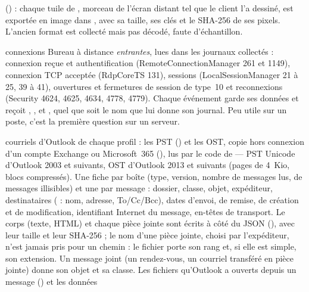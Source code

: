 \documentclass[11pt,a4paper,oneside]{report}
\begin{document}
\begin{description}[style=nextline,leftmargin=1.2em]
        () : chaque tuile de , morceau de
        l'écran distant tel que le client l'a dessiné, est exportée en image
        dans , avec
        sa taille, ses clés et le SHA-256 de ses pixels. L'ancien format
         est collecté mais pas décodé, faute
        d'échantillon.
  \item[\fichier{rdp\_server.json}] connexions Bureau à distance \emph{entrantes},
        lues dans les journaux collectés : connexion reçue et authentification
        (RemoteConnectionManager 261 et 1149), connexion TCP acceptée (RdpCoreTS
        131), sessions (LocalSessionManager 21 à 25, 39 à 41), ouvertures et
        fermetures de session de type~10 et reconnexions (Security 4624, 4625,
        4634, 4778, 4779). Chaque événement garde ses données et reçoit
        , ,  et
        , quel que soit le nom que lui donne son journal. Peu
        utile sur un poste, c'est la première question sur un serveur.
  \item[\fichier{emails.json}] courriels d'Outlook de chaque profil : les PST
        () et les OST, copie
        hors connexion d'un compte Exchange ou Microsoft~365
        (),
        lus par le code de \wac{} — PST Unicode d'Outlook 2003 et suivants, OST
        d'Outlook 2013 et suivants (pages de 4~Kio, blocs compressés). Une fiche
        par boîte (type, version, nombre de messages lus, de messages
        illisibles) et une par message : dossier, classe, objet, expéditeur,
        destinataires ( : nom, adresse, To/Cc/Bcc), dates
        d'envoi, de remise, de création et de modification, identifiant
        Internet du message, en-têtes de transport. Le corps (texte, HTML) et
        chaque pièce jointe sont écrits à côté du JSON
        (),
        avec leur taille et leur SHA-256 ; le nom d'une pièce jointe, choisi
        par l'expéditeur, n'est jamais pris pour un chemin : le fichier porte
        son rang et, si elle est simple, son extension. Un message joint (un
        rendez-vous, un courriel transféré en pièce jointe) donne son objet et
        sa classe. Les fichiers qu'Outlook a ouverts depuis un message
        () et les données

\end{description}
\end{document}
